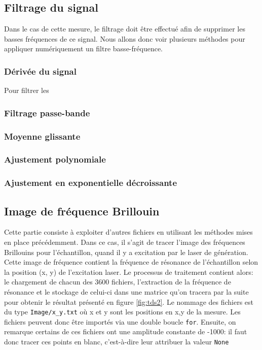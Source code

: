 \documentclass[a4paper,11pt]{article}
\begin{document}
\subsection{Filtrage du signal}
Dans le cas de cette mesure, le filtrage doit être effectué afin de supprimer les basses fréquences de ce signal. Nous allons donc voir plusieurs méthodes pour appliquer numériquement un filtre basse-fréquence.

\subsubsection{Dérivée du signal}
Pour filtrer les 
\subsubsection{Filtrage passe-bande}
\subsubsection{Moyenne glissante}
\subsubsection{Ajustement polynomiale}
\subsubsection{Ajustement en exponentielle décroissante} 

\subsection{Image de fréquence Brillouin}

Cette partie consiste à exploiter d'autres fichiers en utilisant les méthodes mises en place précédemment. Dans ce cas, il s'agit de tracer l'image des fréquences Brillouins pour l'échantillon, quand il y a excitation par le laser de génération. Cette image de fréquence contient la fréquence de résonance de l'échantillon selon la position (x, y) de l'excitation laser. Le processus de traitement contient alors: le chargement de chacun des 3600 fichiers, l'extraction de la fréquence de résonance et le stockage de celui-ci dans une matrice qu'on tracera par la suite pour obtenir le résultat présenté en figure \ref{fig:tds2}. 
Le nommage des fichiers est du type \verb|Image/x_y.txt| où x et y sont les positions en x,y de la mesure. Les fichiers peuvent donc être importés via une double boucle \verb|for|. Ensuite, on remarque certains de ces fichiers ont une amplitude constante de -1000: il faut donc tracer ces points en blanc, c'est-à-dire leur attribuer la valeur \verb|None| 
\end{document}
